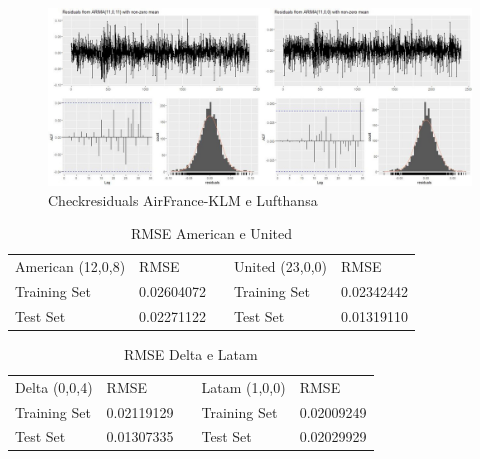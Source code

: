 \documentclass[12pt]{article}
\begin{document}
\begin{figure}[H]
	\centering
	\includegraphics[width=1.0\linewidth]{../Modelos/ResidualsKLMLufthansa}
	\caption{Checkresiduals AirFrance-KLM e Lufthansa}
	\label{fig:residualsklmlufthansa}
\end{figure}

\begin{table}[H]
	\centering
	\begin{tabular}{|l|l|l|l|l|}
		\cline{1-2} \cline{4-5}
		American (12,0,8) & RMSE       & \multirow{3}{*}{} & United (23,0,0) & RMSE       \\ \cline{1-2} \cline{4-5} 
		Training Set      & 0.02604072 &                   & Training Set    & 0.02342442 \\ \cline{1-2} \cline{4-5} 
		Test Set          & 0.02271122 &                   & Test Set        & 0.01319110 \\ \cline{1-2} \cline{4-5} 
	\end{tabular}
\label{tab:RMSEAmerican}
\caption{RMSE American e United}
\end{table}

\begin{table}[H]
	\centering
	\begin{tabular}{|l|l|l|l|l|}
		\cline{1-2} \cline{4-5}
		Delta (0,0,4) & RMSE       & \multirow{3}{*}{} & Latam (1,0,0) & RMSE       \\ \cline{1-2} \cline{4-5} 
		Training Set  & 0.02119129 &                   & Training Set  & 0.02009249 \\ \cline{1-2} \cline{4-5} 
		Test Set      & 0.01307335 &                   & Test Set      & 0.02029929 \\ \cline{1-2} \cline{4-5} 
	\end{tabular}
\label{tab:RMSEDelta}
\caption{RMSE Delta e Latam}
\end{table}
\end{document}
